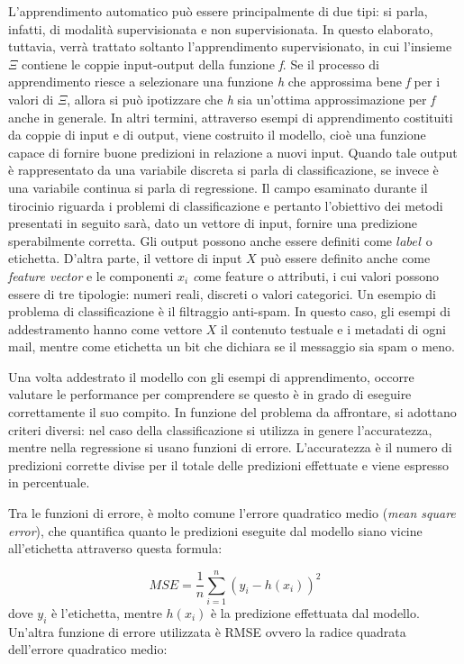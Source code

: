 \documentclass[11pt,  oneside, openany]{book}
\begin{document}
L'apprendimento automatico può essere principalmente di due tipi: si parla, infatti, di modalità supervisionata e non supervisionata. In questo elaborato, tuttavia, verrà trattato soltanto l'apprendimento supervisionato, in cui l'insieme $\Xi$ contiene le coppie input-output della funzione \textit {f}. 
Se il processo di apprendimento riesce a selezionare una funzione \textit {h} che approssima bene \textit {f} per i valori di $\Xi$, allora si può ipotizzare che \textit {h} sia un'ottima approssimazione per \textit {f} anche in generale. In altri termini, attraverso esempi di apprendimento costituiti da coppie di input e di output, viene costruito il modello, cioè una funzione capace di fornire buone predizioni in relazione a nuovi input. 
Quando tale output è rappresentato da una variabile discreta si parla di classificazione, se invece è una variabile continua si parla di regressione. Il campo esaminato durante il tirocinio riguarda i problemi di classificazione e pertanto l'obiettivo dei metodi presentati in seguito sarà, dato un vettore di input, fornire una predizione sperabilmente corretta. Gli output possono anche essere definiti come $label$ o etichetta. D'altra parte, il vettore di input $X$ può essere definito anche come \textit {feature vector} e le componenti $x_i$ \textit come {feature} o attributi, i cui valori possono essere di tre tipologie: numeri reali, discreti o valori categorici.
Un esempio di problema di classificazione è il filtraggio anti-spam. In questo caso, gli esempi di addestramento hanno come vettore $X$  il contenuto testuale e i metadati di ogni mail, mentre come etichetta un bit che dichiara se il messaggio sia spam o meno.

Una volta addestrato il modello con gli esempi di apprendimento, occorre valutare le performance per comprendere se questo è in grado di eseguire correttamente il suo compito. In funzione del problema da affrontare, si adottano criteri diversi: nel caso della classificazione si utilizza in genere l'accuratezza, mentre nella regressione si  usano funzioni di errore. L'accuratezza è il numero di predizioni corrette divise per il totale delle predizioni effettuate e viene espresso in percentuale. 

Tra le funzioni di errore, è molto comune l'errore quadratico medio (\textit{mean square error}), che quantifica quanto le predizioni eseguite dal modello siano vicine all'etichetta attraverso questa formula: 

$$MSE = \frac{1}{n}\sum_{i=1}^{n}(y_{i} - h(x_{i}))^{2}$$ 
dove $y_i$ è l'etichetta, mentre $h(x_{i})$ è la predizione effettuata dal modello. 
Un'altra funzione di errore utilizzata è RMSE ovvero la radice quadrata dell'errore quadratico medio: 
\end{document}
